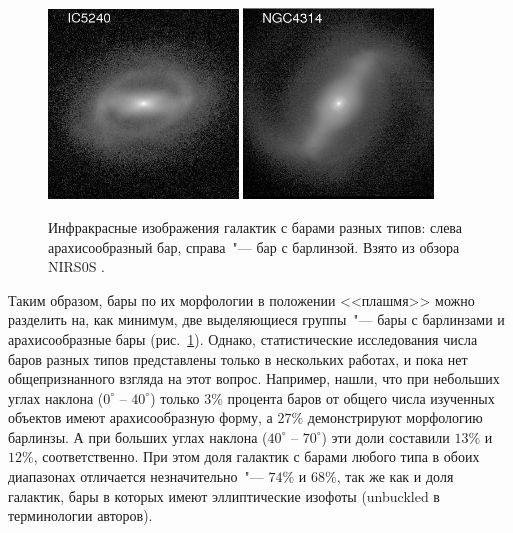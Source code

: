 \documentclass{trlnotes}
\begin{document}
\begin{figure}[htpb]
  \centering
  \hfill
  \includegraphics[width=0.45\textwidth]{img/intro/bartypes/ic5240K_view.jpg}\hfill
  \includegraphics[width=0.45\textwidth]{img/intro/bartypes/ngc4314K_view.jpg}\hfill ${}$
  \caption{Инфракрасные изображения галактик с барами разных типов: слева арахисообразный бар, 
  справа~"--- бар с барлинзой. Взято из обзора NIRS0S \citep{laurikainen2011}.}
  \label{fig:morphcomp}
\end{figure}

Таким образом, бары по их морфологии в положении <<плашмя>> можно разделить на, как минимум, две выделяющиеся группы~"--- бары с барлинзами и арахисообразные бары (рис.~\ref{fig:morphcomp}). Однако, статистические исследования числа баров разных типов представлены только в нескольких работах, и пока нет общепризнанного взгляда на этот вопрос. Например, \citet{li2017a} нашли, что при небольших углах наклона ($0^\circ$ -- $40^\circ$) только $3\%$ процента баров от общего числа изученных объектов имеют арахисообразную форму, а $27\%$ демонстрируют морфологию барлинзы. А при больших углах наклона ($40^\circ$ -- $70^\circ$) эти доли составили $13\%$ и $12\%$,  соответственно.  При этом доля галактик с барами любого типа в обоих диапазонах отличается незначительно~"--- $74\%$ и $68\%$, так же как и доля галактик, бары в которых имеют эллиптические изофоты (unbuckled в терминологии авторов). 
\end{document}

